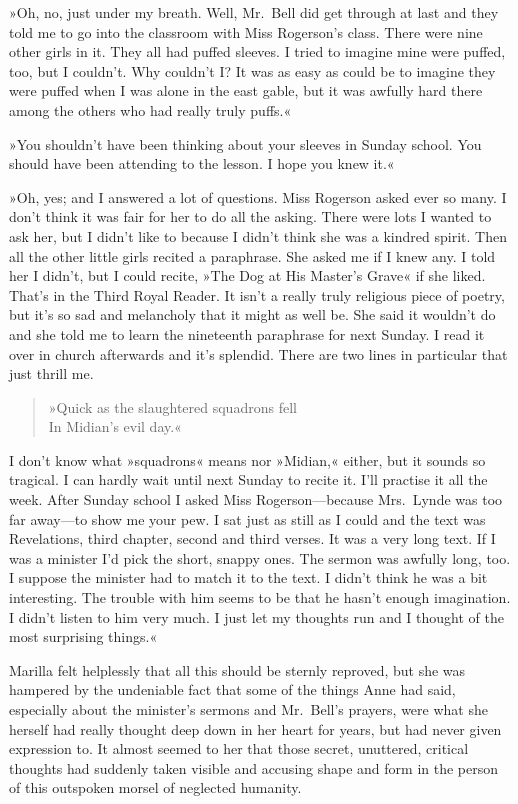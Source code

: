 »Oh, no, just under my breath. Well, Mr.~Bell did get through at last and they told me to go into the classroom with Miss Rogerson's class. There were nine other girls in it. They all had puffed sleeves. I tried to imagine mine were puffed, too, but I couldn't. Why couldn't I? It was as easy as could be to imagine they were puffed when I was alone in the east gable, but it was awfully hard there among the others who had really truly puffs.«

»You shouldn't have been thinking about your sleeves in Sunday school. You should have been attending to the lesson. I hope you knew it.«

»Oh, yes; and I answered a lot of questions. Miss Rogerson asked ever so many. I don't think it was fair for her to do all the asking. There were lots I wanted to ask her, but I didn't like to because I didn't think she was a kindred spirit. Then all the other little girls recited a paraphrase. She asked me if I knew any. I told her I didn't, but I could recite, »The Dog at His Master's Grave« if she liked. That's in the Third Royal Reader. It isn't a really truly religious piece of poetry, but it's so sad and melancholy that it might as well be. She said it wouldn't do and she told me to learn the nineteenth paraphrase for next Sunday. I read it over in church afterwards and it's splendid. There are two lines in particular that just thrill me.

\begin{verse}
»Quick as the slaughtered squadrons fell\\
In Midian's evil day.«
\end{verse}

I don't know what »squadrons« means nor »Midian,« either, but it sounds so tragical. I can hardly wait until next Sunday to recite it. I'll practise it all the week. After Sunday school I asked Miss Rogerson—because Mrs.~Lynde was too far away—to show me your pew. I sat just as still as I could and the text was Revelations, third chapter, second and third verses. It was a very long text. If I was a minister I'd pick the short, snappy ones. The sermon was awfully long, too. I suppose the minister had to match it to the text. I didn't think he was a bit interesting. The trouble with him seems to be that he hasn't enough imagination. I didn't listen to him very much. I just let my thoughts run and I thought of the most surprising things.«

Marilla felt helplessly that all this should be sternly reproved, but she was hampered by the undeniable fact that some of the things Anne had said, especially about the minister's sermons and Mr.~Bell's prayers, were what she herself had really thought deep down in her heart for years, but had never given expression to. It almost seemed to her that those secret, unuttered, critical thoughts had suddenly taken visible and accusing shape and form in the person of this outspoken morsel of neglected humanity.